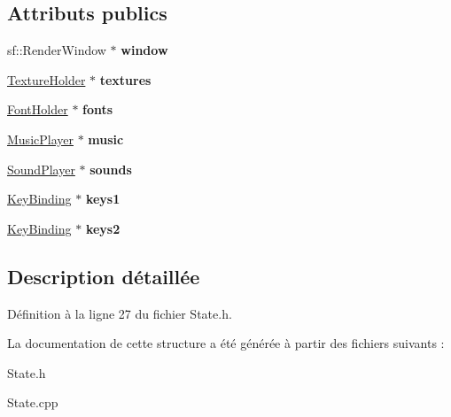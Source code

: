 \subsection*{Attributs publics}
\begin{DoxyCompactItemize}
\item 
\hypertarget{struct_state_1_1_context_a30775e70e841c761a4e3cb7f0e195128}{}\label{struct_state_1_1_context_a30775e70e841c761a4e3cb7f0e195128} 
sf\+::\+Render\+Window $\ast$ {\bfseries window}
\item 
\hypertarget{struct_state_1_1_context_a587123ee3b00e8c68c1d99ca6011a53d}{}\label{struct_state_1_1_context_a587123ee3b00e8c68c1d99ca6011a53d} 
\hyperlink{class_resource_holder}{Texture\+Holder} $\ast$ {\bfseries textures}
\item 
\hypertarget{struct_state_1_1_context_a8b4a94c250018312ccf2e58a33f0c77a}{}\label{struct_state_1_1_context_a8b4a94c250018312ccf2e58a33f0c77a} 
\hyperlink{class_resource_holder}{Font\+Holder} $\ast$ {\bfseries fonts}
\item 
\hypertarget{struct_state_1_1_context_a3a618b644dde5d8ae0b3f4832e4d4506}{}\label{struct_state_1_1_context_a3a618b644dde5d8ae0b3f4832e4d4506} 
\hyperlink{class_music_player}{Music\+Player} $\ast$ {\bfseries music}
\item 
\hypertarget{struct_state_1_1_context_a763caa3fc28d5ee0ad994a4d92a7d0ff}{}\label{struct_state_1_1_context_a763caa3fc28d5ee0ad994a4d92a7d0ff} 
\hyperlink{class_sound_player}{Sound\+Player} $\ast$ {\bfseries sounds}
\item 
\hypertarget{struct_state_1_1_context_a22305c8b4ba50e843cfb2852a2a262aa}{}\label{struct_state_1_1_context_a22305c8b4ba50e843cfb2852a2a262aa} 
\hyperlink{class_key_binding}{Key\+Binding} $\ast$ {\bfseries keys1}
\item 
\hypertarget{struct_state_1_1_context_aa879f53ba0763910ee01b248956e0d1d}{}\label{struct_state_1_1_context_aa879f53ba0763910ee01b248956e0d1d} 
\hyperlink{class_key_binding}{Key\+Binding} $\ast$ {\bfseries keys2}
\end{DoxyCompactItemize}


\subsection{Description détaillée}


Définition à la ligne 27 du fichier State.\+h.



La documentation de cette structure a été générée à partir des fichiers suivants \+:\begin{DoxyCompactItemize}
\item 
State.\+h\item 
State.\+cpp\end{DoxyCompactItemize}
